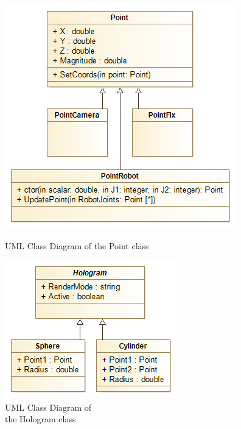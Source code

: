 \begin{figure}[!h]
	\begin{minipage}{0.65\textwidth}
		\centering
		\includegraphics[width=0.8\linewidth]{Figures/Implementation_Points}
		\caption{UML Class Diagram of the Point class}
		\label{Ffig:ImplementationPoints}
	\end{minipage}\hfill
	\begin{minipage}{0.35\textwidth}
		\centering
		\includegraphics[width=1\linewidth]{Figures/Implementation_Holograms}
		\caption{UML Class Diagram of\\the Hologram class}
		\label{Fig:ImplementationHolograms}
	\end{minipage}
\end{figure}

